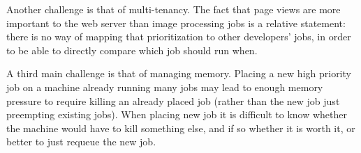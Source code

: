 Another challenge is that of multi-tenancy. The fact that page views are more
important to the web server than image processing jobs is a relative statement:
there is no way of mapping that prioritization to other developers' jobs, in
order to be able to directly compare which job should run when. 


A third main challenge is that of managing memory. Placing a new high priority
job on a machine already running many jobs may lead to enough memory pressure to
require killing an already placed job (rather than the new job just preempting
existing jobs). When placing new job it is difficult to know whether the machine
would have to kill something else, and if so whether it is worth it, or better
to just requeue the new job.

 
